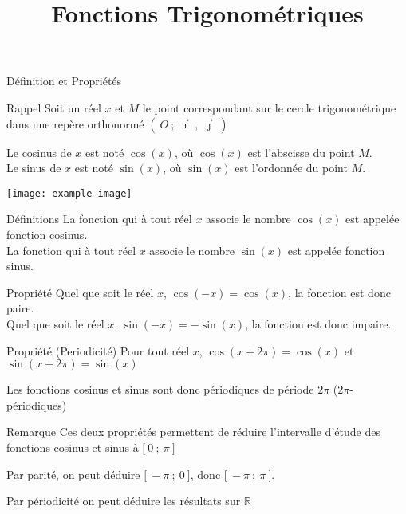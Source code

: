 \documentclass{cours}
\title{Fonctions Trigonométriques}
\begin{document}

    \begin{Gpartie}{Définition et Propriétés} 
        \begin{Spartie}{Rappel} 
            Soit un réel $x$ et $M$ le point correspondant sur le cercle trigonométrique dans une repère orthonormé $\left(~O~;~\vec{\imath}~,~\vec{\jmath}~\right)$

            Le cosinus de $x$ est noté $\cos(x)$, où $\cos(x)$ est l'abscisse du point $M$. \\
            Le sinus de $x$ est noté $\sin(x)$, où $\sin(x)$ est l'ordonnée du point $M$.
            
            \begin{center}
                    \texttt{[image: example-image]}
                \parbox{\linewidth}{}
            \end{center}
        \end{Spartie}
        \begin{Spartie}{Définitions} 
            La fonction qui à tout réel $x$ associe le nombre $\cos(x)$ est appelée fonction cosinus. \\
            La fonction qui à tout réel $x$ associe le nombre $\sin(x)$ est appelée fonction sinus.
        \end{Spartie}
        \begin{Spartie}{Propriété} 
            Quel que soit le réel $x$, $\cos(-x)=\cos(x)$, la fonction est donc paire. \\
            Quel que soit le réel $x$, $\sin(-x)=-\sin(x)$, la fonction est donc impaire.
        \end{Spartie}
        \begin{Spartie}{Propriété (Periodicité)} 
            Pour tout réel $x$, $\cos(x+2\pi)=\cos(x)$ et $\sin(x+2\pi)=\sin(x)$

            Les fonctions cosinus et sinus sont donc périodiques de période $2\pi$ ($2\pi$-périodiques)
        \end{Spartie}
        \begin{Spartie}{Remarque} 
            Ces deux propriétés permettent de réduire l'intervalle d'étude des fonctions cosinus et sinus à $\big[~0~;~\pi~\big]$

            Par parité, on peut déduire $\big[~-\pi~;~0~\big]$, donc $\big[~-\pi~;~\pi~\big]$.
            
            Par périodicité on peut déduire les résultats sur $\mathbb{R}$
        \end{Spartie}
    \end{Gpartie}
\end{document}
